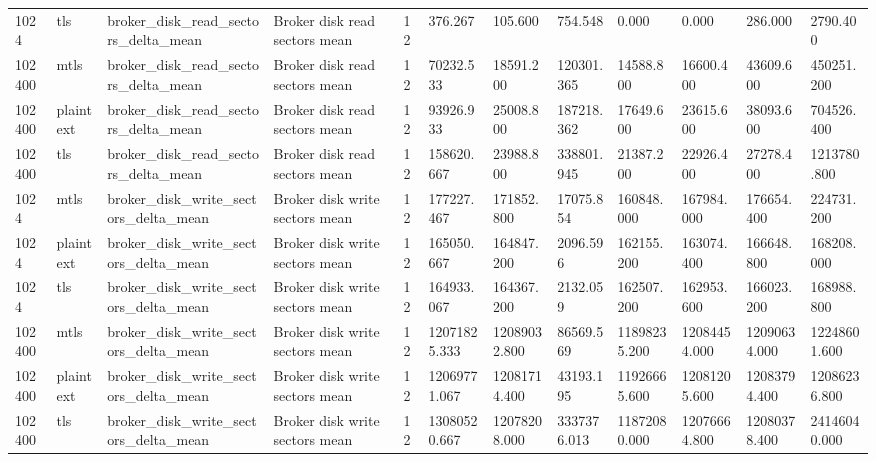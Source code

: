 \begin{longtable}{llllllllllll}
1024 & tls & broker\_disk\_read\_sectors\_delta\_mean & Broker disk read sectors mean & 12 & 376.267 & 105.600 & 754.548 & 0.000 & 0.000 & 286.000 & 2790.400 \\
102400 & mtls & broker\_disk\_read\_sectors\_delta\_mean & Broker disk read sectors mean & 12 & 70232.533 & 18591.200 & 120301.365 & 14588.800 & 16600.400 & 43609.600 & 450251.200 \\
102400 & plaintext & broker\_disk\_read\_sectors\_delta\_mean & Broker disk read sectors mean & 12 & 93926.933 & 25008.800 & 187218.362 & 17649.600 & 23615.600 & 38093.600 & 704526.400 \\
102400 & tls & broker\_disk\_read\_sectors\_delta\_mean & Broker disk read sectors mean & 12 & 158620.667 & 23988.800 & 338801.945 & 21387.200 & 22926.400 & 27278.400 & 1213780.800 \\
1024 & mtls & broker\_disk\_write\_sectors\_delta\_mean & Broker disk write sectors mean & 12 & 177227.467 & 171852.800 & 17075.854 & 160848.000 & 167984.000 & 176654.400 & 224731.200 \\
1024 & plaintext & broker\_disk\_write\_sectors\_delta\_mean & Broker disk write sectors mean & 12 & 165050.667 & 164847.200 & 2096.596 & 162155.200 & 163074.400 & 166648.800 & 168208.000 \\
1024 & tls & broker\_disk\_write\_sectors\_delta\_mean & Broker disk write sectors mean & 12 & 164933.067 & 164367.200 & 2132.059 & 162507.200 & 162953.600 & 166023.200 & 168988.800 \\
102400 & mtls & broker\_disk\_write\_sectors\_delta\_mean & Broker disk write sectors mean & 12 & 12071825.333 & 12089032.800 & 86569.569 & 11898235.200 & 12084454.000 & 12090634.000 & 12248601.600 \\
102400 & plaintext & broker\_disk\_write\_sectors\_delta\_mean & Broker disk write sectors mean & 12 & 12069771.067 & 12081714.400 & 43193.195 & 11926665.600 & 12081205.600 & 12083794.400 & 12086236.800 \\
102400 & tls & broker\_disk\_write\_sectors\_delta\_mean & Broker disk write sectors mean & 12 & 13080520.667 & 12078208.000 & 3337376.013 & 11872080.000 & 12076664.800 & 12080378.400 & 24146040.000 \\
\hline
\end{longtable}
